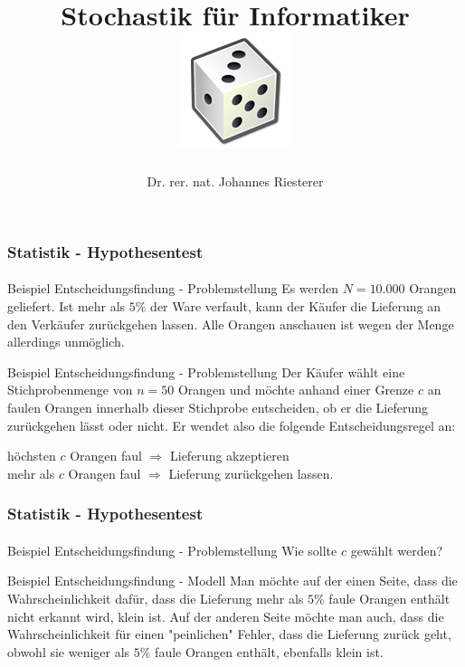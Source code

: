 \documentclass{beamer}
\begin{document}
\title[Stochastik] %
{Stochastik für Informatiker
\\
\includegraphics[scale=0.5]{img/craps}
}
\subtitle{}
\author[Dr. Johannes Riesterer] %
{Dr.  rer. nat. Johannes Riesterer}

\date[KPT 2004] %
{}

\subject{Stochastik}

\frame{\titlepage}




\begin{frame}
    \frametitle{Statistik - Hypothesentest}
\framesubtitle{}

\begin{block}{Beispiel Entscheidungsfindung - Problemstellung}
Es werden $N= 10.000$ Orangen geliefert. Ist mehr als $5\%$ der Ware verfault, kann der Käufer  die Lieferung an den Verkäufer zurückgehen lassen.
Alle Orangen anschauen ist wegen der Menge allerdings unmöglich.
\end{block}

\begin{block}{Beispiel Entscheidungsfindung - Problemstellung}
Der   Käufer wählt eine Stichprobenmenge  von $n=50$ Orangen  und möchte anhand einer Grenze  $c$ an faulen Orangen innerhalb dieser Stichprobe entscheiden,
ob er die Lieferung zurückgehen lässt oder nicht.  Er wendet also die folgende Entscheidungsregel an:
\begin{center}
höchsten $c$ Orangen  faul $\Rightarrow$ Lieferung akzeptieren \\
mehr als  $c$ Orangen  faul $\Rightarrow$ Lieferung  zurückgehen lassen.
\end{center}
\end{block}



 \end{frame}

\begin{frame}
    \frametitle{Statistik - Hypothesentest}
\framesubtitle{}
\begin{block}{Beispiel Entscheidungsfindung - Problemstellung}
Wie sollte $c$ gewählt werden?
\end{block}


\begin{block}{Beispiel Entscheidungsfindung - Modell}
Man möchte auf der einen Seite, dass die Wahrscheinlichkeit dafür, dass die Lieferung mehr als $5 \%$ faule Orangen enthält nicht erkannt wird, klein ist.
Auf der anderen Seite möchte man auch, dass die Wahrscheinlichkeit für einen  "peinlichen" Fehler, dass die Lieferung zurück geht, obwohl sie weniger als  $5 \%$ faule Orangen enthält, ebenfalls klein ist. 
\end{block}


 \end{frame}
\end{document}
